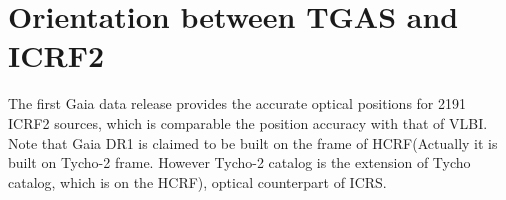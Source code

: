 \documentclass[onecolumn]{aa}   %
\begin{document}
  






\section{Orientation between TGAS and ICRF2}    \label{sec:orientation}

The first Gaia data release provides the accurate optical positions for 2191 ICRF2 sources, which is comparable the position accuracy with that of VLBI. Note that Gaia DR1 is claimed to be built on the frame of HCRF(Actually it is built on Tycho-2 frame. However Tycho-2 catalog is the extension of Tycho catalog, which is on the HCRF), optical counterpart of ICRS. 
\end{document}
